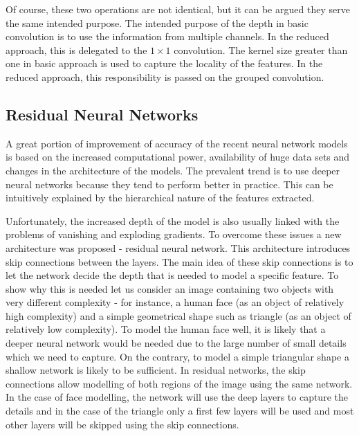 Of course, these two operations are not identical, but it can be argued they serve the same intended purpose.
The intended purpose of the depth in basic convolution is to use the information from multiple channels.
In the reduced approach, this is delegated to the $1 \times 1$ convolution.
The kernel size greater than one in basic approach is used to capture the locality of the features.
In the reduced approach, this responsibility is passed on the grouped convolution. 

\subsection{Residual Neural Networks}
A great portion of improvement of accuracy of the recent neural network models is based on the increased computational power, availability of huge data sets and changes in the architecture of the models.
The prevalent trend is to use deeper neural networks because they tend to perform better in practice.
This can be intuitively explained by the hierarchical nature of the features extracted.

Unfortunately, the increased depth of the model is also usually linked with the problems of vanishing and exploding gradients.
To overcome these issues a new architecture was proposed - residual neural network.
This architecture introduces skip connections between the layers. 
The main idea of these skip connections is to let the network decide the depth that is needed to model a specific feature.
To show why this is needed let us consider an image containing two objects with very different complexity - for instance, a human face (as an object of relatively high complexity) and a simple geometrical shape such as triangle (as an object of relatively low complexity).
To model the human face well, it is likely that a deeper neural network would be needed due to the large number of small details which we need to capture.
On the contrary, to model a simple triangular shape a shallow network is likely to be sufficient.
In residual networks, the skip connections allow modelling of both regions of the image using the same network.
In the case of face modelling, the network will use the deep layers to capture the details and in the case of the triangle only a first few layers will be used and most other layers will be skipped using the skip connections.

